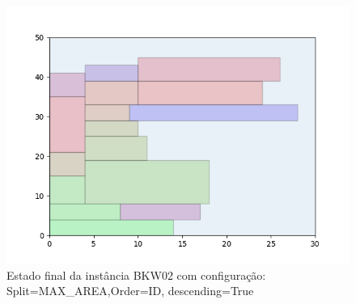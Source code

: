 \begin{figure}[H]
    \centering
    \caption[]{Estado final da instância BKW02 com configuração: Split=MAX_AREA,Order=ID, descending=True}
    \label{fig:bkw02-max_area-id-true}
    \includegraphics[scale=0.5]{output/figures/bkw/bkw02/max_area/id/true/00}
\end{figure}